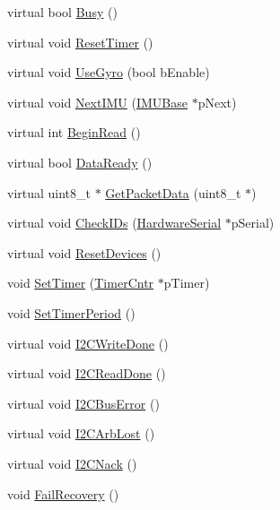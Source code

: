 \begin{DoxyCompactItemize}
virtual bool \hyperlink{class_i_m_u_ade0f7e6be2eda441bfaa2cb372fec55a}{Busy} ()
\item 
virtual void \hyperlink{class_i_m_u_a187dc9de30f97f5154e0ff904eb6ee1a}{ResetTimer} ()
\item 
virtual void \hyperlink{class_i_m_u_a86f05be645d2096f0b2b3cfbe8ea0ce8}{UseGyro} (bool bEnable)
\item 
virtual void \hyperlink{class_i_m_u_ac46c8e580371cf97e4625dda450f01fd}{NextIMU} (\hyperlink{class_i_m_u_base}{IMUBase} $\ast$pNext)
\item 
virtual int \hyperlink{class_i_m_u_a3c949edee15e2f618d7ee263b0a4bcb3}{BeginRead} ()
\item 
virtual bool \hyperlink{class_i_m_u_a078d2f3ad27475c9afcaf09c44886e4c}{DataReady} ()
\item 
virtual uint8\_\-t $\ast$ \hyperlink{class_i_m_u_a4f72b7f99fc42f30c9478ba7ed65654e}{GetPacketData} (uint8\_\-t $\ast$)
\item 
virtual void \hyperlink{class_i_m_u_a74feb2946c48a92b251e28ac256d887b}{CheckIDs} (\hyperlink{class_hardware_serial}{HardwareSerial} $\ast$pSerial)
\item 
virtual void \hyperlink{class_i_m_u_a98f9a8244dd1a07f8771450097371b2c}{ResetDevices} ()
\item 
void \hyperlink{class_i_m_u_a66680475b844fbf334a0e4e7c5fe845b}{SetTimer} (\hyperlink{class_timer_cntr}{TimerCntr} $\ast$pTimer)
\item 
void \hyperlink{class_i_m_u_a3ce9934e64dff87e18b6cc3f3700f72f}{SetTimerPeriod} ()
\item 
virtual void \hyperlink{class_i_m_u_a71568969beb6ee7d4b596f8c0a91faf9}{I2CWriteDone} ()
\item 
virtual void \hyperlink{class_i_m_u_ab4124ae29a64365787c2c03b3ab09c6c}{I2CReadDone} ()
\item 
virtual void \hyperlink{class_i_m_u_aad041ec91d266e9fc15d22de17ffccad}{I2CBusError} ()
\item 
virtual void \hyperlink{class_i_m_u_a7d4a2a761fb4956ebd9ce0b0cda69556}{I2CArbLost} ()
\item 
virtual void \hyperlink{class_i_m_u_a161f80bfcb7195196754a18eddedaf12}{I2CNack} ()
\item 
void \hyperlink{class_i_m_u_acf8e9ee1971e527c255c046d3d3c1fe9}{FailRecovery} ()
\end{DoxyCompactItemize}
